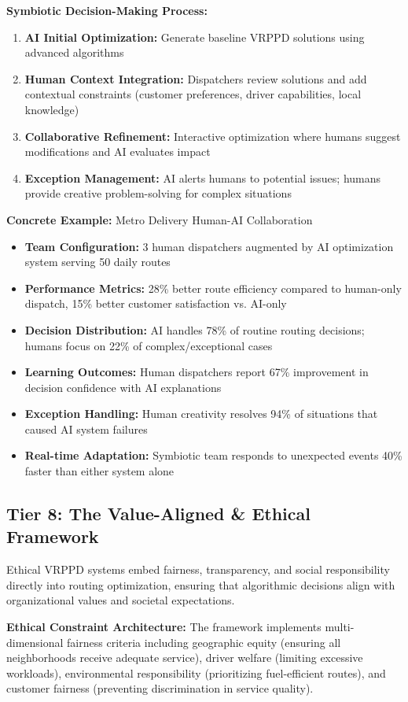 \documentclass{article}
\begin{document}
\textbf{Symbiotic Decision-Making Process:}
\begin{enumerate}
\item \textbf{AI Initial Optimization:} Generate baseline VRPPD solutions using advanced algorithms
\item \textbf{Human Context Integration:} Dispatchers review solutions and add contextual constraints (customer preferences, driver capabilities, local knowledge)
\item \textbf{Collaborative Refinement:} Interactive optimization where humans suggest modifications and AI evaluates impact
\item \textbf{Exception Management:} AI alerts humans to potential issues; humans provide creative problem-solving for complex situations
\end{enumerate}

\textbf{Concrete Example:} Metro Delivery Human-AI Collaboration
\begin{itemize}
\item \textbf{Team Configuration:} 3 human dispatchers augmented by AI optimization system serving 50 daily routes
\item \textbf{Performance Metrics:} 28\% better route efficiency compared to human-only dispatch, 15\% better customer satisfaction vs. AI-only
\item \textbf{Decision Distribution:} AI handles 78\% of routine routing decisions; humans focus on 22\% of complex/exceptional cases
\item \textbf{Learning Outcomes:} Human dispatchers report 67\% improvement in decision confidence with AI explanations
\item \textbf{Exception Handling:} Human creativity resolves 94\% of situations that caused AI system failures
\item \textbf{Real-time Adaptation:} Symbiotic team responds to unexpected events 40\% faster than either system alone
\end{itemize}

\subsection{Tier 8: The Value-Aligned \& Ethical Framework}

Ethical VRPPD systems embed fairness, transparency, and social responsibility directly into routing optimization, ensuring that algorithmic decisions align with organizational values and societal expectations.

\textbf{Ethical Constraint Architecture:}
The framework implements multi-dimensional fairness criteria including geographic equity (ensuring all neighborhoods receive adequate service), driver welfare (limiting excessive workloads), environmental responsibility (prioritizing fuel-efficient routes), and customer fairness (preventing discrimination in service quality).
\end{document}
